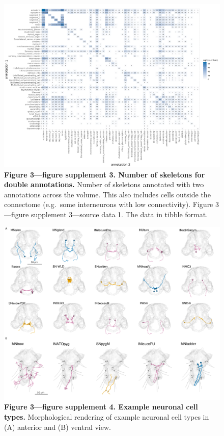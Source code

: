 \documentclass[
  11pt,
]{article}
\begin{document}
\begin{figure}[H]

{\centering \includegraphics[width=1\textwidth,height=\textheight]{Figures/Figure3_fig_suppl3.png}

}

\caption{\textbf{Figure 3---figure supplement 3. Number of skeletons for
double annotations. } Number of skeletons annotated with two annotations
across the volume. This also includes cells outside the connectome
(e.g.~some interneurons with low connectivity). Figure 3---figure
supplement 3---source data 1. The data in tibble format.}

\end{figure}%

\begin{figure}[H]

{\centering \includegraphics[width=1\textwidth,height=\textheight]{Figures/Figure3_fig_suppl4.png}

}

\caption{\textbf{Figure 3---figure supplement 4. Example neuronal cell
types. } Morphological rendering of example neuronal cell types in (A)
anterior and (B) ventral view.}

\end{figure}%
\end{document}
